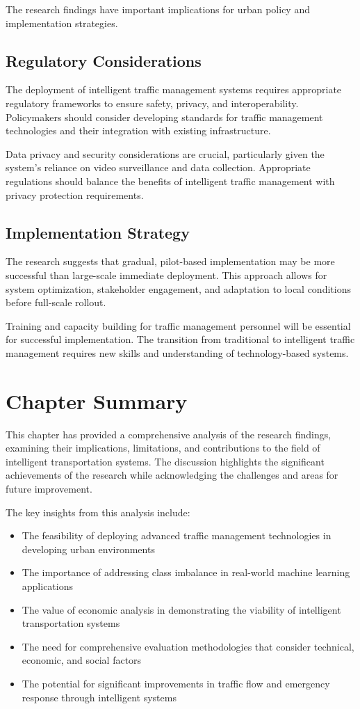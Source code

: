 The research findings have important implications for urban policy and implementation strategies.

\subsection{Regulatory Considerations}
The deployment of intelligent traffic management systems requires appropriate regulatory frameworks to ensure safety, privacy, and interoperability. Policymakers should consider developing standards for traffic management technologies and their integration with existing infrastructure.

Data privacy and security considerations are crucial, particularly given the system's reliance on video surveillance and data collection. Appropriate regulations should balance the benefits of intelligent traffic management with privacy protection requirements.

\subsection{Implementation Strategy}
The research suggests that gradual, pilot-based implementation may be more successful than large-scale immediate deployment. This approach allows for system optimization, stakeholder engagement, and adaptation to local conditions before full-scale rollout.

Training and capacity building for traffic management personnel will be essential for successful implementation. The transition from traditional to intelligent traffic management requires new skills and understanding of technology-based systems.

\section{Chapter Summary}
\label{sec:discussion_summary}

This chapter has provided a comprehensive analysis of the research findings, examining their implications, limitations, and contributions to the field of intelligent transportation systems. The discussion highlights the significant achievements of the research while acknowledging the challenges and areas for future improvement.

The key insights from this analysis include:

\begin{itemize}
    \item The feasibility of deploying advanced traffic management technologies in developing urban environments
    \item The importance of addressing class imbalance in real-world machine learning applications
    \item The value of economic analysis in demonstrating the viability of intelligent transportation systems
    \item The need for comprehensive evaluation methodologies that consider technical, economic, and social factors
    \item The potential for significant improvements in traffic flow and emergency response through intelligent systems
\end{itemize}

